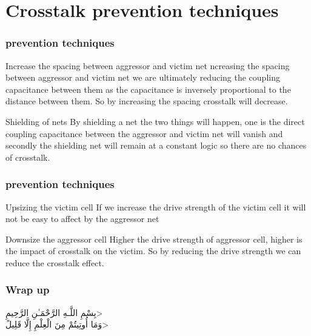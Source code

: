 \documentclass{beamer}
\begin{document}
	\section{Crosstalk prevention techniques}	
	\begin{frame}
		\frametitle{prevention techniques}
	
	\begin{block}{Increase the spacing between aggressor and victim net}
		ncreasing the spacing between aggressor and victim net we are ultimately reducing the coupling capacitance between them as the capacitance is inversely proportional to the distance between them. So by increasing the spacing crosstalk will decrease.
	\end{block} 

			\begin{block}{Shielding of nets}
		By shielding a net the two things will happen, one is the direct coupling capacitance between the aggressor and victim net will vanish and secondly the shielding net will remain at a constant logic so there are no chances of crosstalk.
			\end{block} 
		
	\end{frame}
	\begin{frame}
		\frametitle{prevention techniques}
		\begin{block}{Upsizing the victim cell}
			If we increase the drive strength of the victim cell it will not be easy to affect by the aggressor net
		\end{block}
		
		\begin{block}{Downsize the aggressor cell}
			Higher the drive strength of aggressor cell, higher is the impact of crosstalk on the victim. So by reducing the drive strength we can reduce the crosstalk effect. 
		\end{block}
	\end{frame}
	\begin{frame}
		\frametitle{Wrap up}
		\begin{center}
			\<بِسْمِ اللَّـهِ الرَّحْمَـٰنِ الرَّحِيمِ> \\
			\<وَمَا أُوتِيتُمْ مِنَ الْعِلْمِ إِلَّا قَلِيلً>
			
		\end{center}
	\end{frame}	
\end{document}
